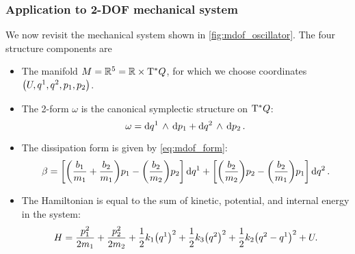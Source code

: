 \subsubsection{Application to 2-DOF mechanical system}
We now revisit the mechanical system shown in \cref{fig:mdof_oscillator}. The four structure components are
\begin{itemize}
    \item The manifold \(M = \mathbb{R}^5 = \mathbb{R} \times \mathrm{T}^*Q\), for which we choose coordinates \(\qty(U, q^1, q^2, p_1, p_2)\).
    \item The 2-form \(\omega\) is the canonical symplectic structure on \(\mathrm{T}^*Q\):
        \begin{equation}
     \omega =  \dd{q^1}\,\wedge\,\dd{p_1}  +  \dd{q^2}\,\wedge\,\dd{p_2} .
\end{equation}
    \item The dissipation form is given by \cref{eq:mdof_form}:
        \begin{equation}
     \beta =  \qty[\qty(\frac{b_1}{m_1} + \frac{b_2}{m_1}) p_1 - \qty(\frac{b_2}{m_2})p_2]\dd{q^1}
                          + \qty[\qty(\frac{b_2}{m_2})p_2 - \qty(\frac{b_2}{m_1})p_1]\dd{q^2}.
\end{equation}
    \item The Hamiltonian is equal to the sum of kinetic, potential, and internal energy in the system:
        \begin{equation}
     H = \frac{p^2_1}{2m_1} + \frac{p^2_2}{2m_2} + \frac{1}{2}k_1\qty(q^1)^2 + \frac{1}{2}k_3\qty(q^2)^2 + \frac{1}{2}k_2\qty(q^2 - q^1)^2 + U.
\end{equation}
\end{itemize}

